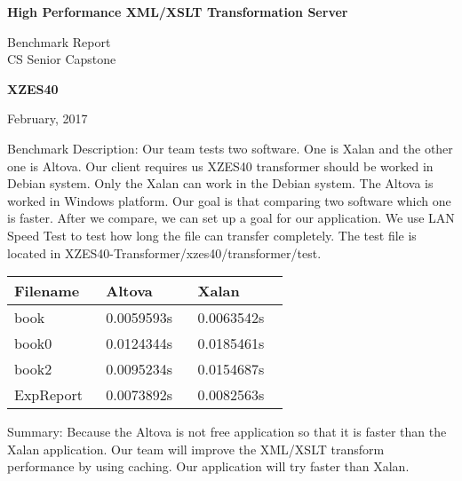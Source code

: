 \documentclass[letterpaper,10pt,titlepage]{article}
\begin{document}
\begin{titlepage}
    \begin{center}
        \vspace*{1cm}
        \Huge
        \textbf{High Performance XML/XSLT Transformation Server}
        \vspace{0.5cm}
        
        \LARGE
        Benchmark Report \\
        \vspace{1cm}
        CS Senior Capstone \\
        \vspace{1.5cm}

        \textbf{XZES40}
        \date{February, 2017}
        \vfill
        February, 2017
    \end{center}
\end{titlepage}

Benchmark Description:
Our team tests two software. One is Xalan and the other one is Altova. Our client
requires us XZES40 transformer should be worked in Debian system. Only the Xalan
can work in the Debian system. The Altova is worked in Windows platform. Our goal
is that comparing two software which one is faster. After we compare, we can set up a
goal for our application. We use LAN Speed Test to test how long the file can transfer
completely. The test file is located in XZES40-Transformer/xzes40/transformer/test.

\begin{longtable}{ | p{0.3\linewidth} | p{0.3\linewidth} | p{0.3\linewidth} |} \hline
  Filename & Altova & Xalan  \\ \hline
  	book &
    0.0059593s &
    0.0063542s  \\
  \hline
  	book0 &
    0.0124344s &
    0.0185461s\\
  \hline
    book2 &
    0.0095234s &
    0.0154687s \\
    \hline
    ExpReport &
    0.0073892s &
    0.0082563s \\
    \hline
\end{longtable}

Summary:
Because the Altova is not free application so that it is faster than the Xalan application.
Our team will improve the XML/XSLT transform performance by using caching. 
Our application will try faster than Xalan. 


\newpage
\end{document}
